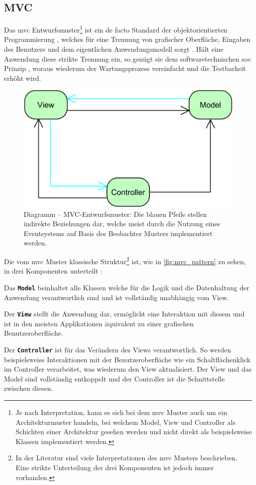 \subsection{MVC}
Das \ac{mvc} Entwurfsmuster\footnote{Je nach Interpretation, kann es sich bei dem \ac{mvc} Muster auch um ein Architekturmuster handeln, bei welchem Model, View und Controller als Schichten einer Architektur gesehen werden und nicht direkt als beispielsweise Klassen implementiert werden.} ist ein de facto Standard der objektorientierten Programmierung \cite{Deacon1995}, welches für eine Trennung von grafischer Oberfläche, Eingaben des Benutzers und dem eigentlichen Anwendungsmodell sorgt \cite{Burbeck1992}. Hält eine Anwendung diese strikte Trennung ein, so genügt sie dem softwaretechnischen \ac{soc} Prinzip \cite{Grant2014}, woraus wiederum der Wartungsprozess vereinfacht und die Testbarkeit erhöht wird.
\begin{figure}[H]
	\centering
	\includegraphics[width=\textwidth-2cm]{Abbildungen/MVC Pattern.png}
	\caption[Diagramm -- MVC-Entwurfsmuster]{Diagramm -- MVC-Entwurfsmuster: Die blauen Pfeile stellen indirekte Beziehungen dar, welche meist durch die Nutzung eines Eventsystems auf Basis des Beobachter Musters implementiert werden.}
	\label{fig:mvc_pattern}
\end{figure}
\noindent Die vom \ac{mvc} Muster klassische Struktur\footnote{In der Literatur sind viele Interpretationen des \ac{mvc} Musters beschrieben. Eine strikte Unterteilung der drei Komponenten ist jedoch immer vorhanden.} ist, wie in \autoref{fig:mvc_pattern} zu sehen, in drei Komponenten unterteilt \cite{Deacon1995}:
\begin{description}
	\item Das \texttt{\textbf{Model}} beinhaltet alle Klassen welche für die Logik und die Datenhaltung der Anwendung verantwortlich sind und ist vollständig unabhängig vom View.
	\item Der \texttt{\textbf{View}} stellt die Anwendung dar, ermöglicht eine Interaktion mit diesem und ist in den meisten Applikationen äquivalent zu einer grafischen Benutzeroberfläche.
	\item Der \texttt{\textbf{Controller}} ist für das Verändern des Views verantwortlich. So werden beispielsweise Interaktionen mit der Benutzeroberfläche wie ein Schaltflächenklick im Controller verarbeitet, was wiederum den View aktualisiert. Der View und das Model sind vollständig entkoppelt und der Controller ist die Schnittstelle zwischen diesen.
\end{description}
